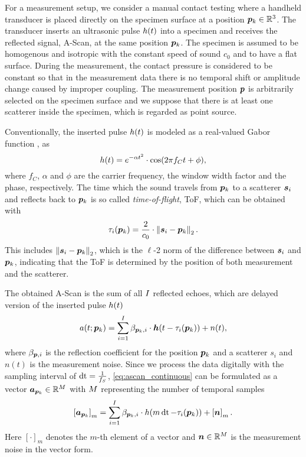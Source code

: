 For a measurement setup, we consider a manual contact testing where a handheld transducer is placed directly on the specimen surface at a position $\bm{p}_{k} \in {\mathbb{R}}^{3}$.
The transducer inserts an ultrasonic pulse $h (t)$ into a specimen and receives the reflected signal, A-Scan, at the same position $\bm{p}_{k}$. The specimen is assumed to be homogenous and isotropic with the constant speed of sound $c_0$ and to have a flat surface. During the measurement, the contact pressure is considered to be constant so that in the measurement data there is no temporal shift or amplitude change caused by improper coupling. The measurement position $\bm{p}$ is arbitrarily selected on the specimen surface and we suppose that there is at least one scatterer inside the specimen, which is regarded as point source. \par

Conventionally, the inserted pulse $h (t)$ is modeled as a real-valued Gabor function \citep{GaborAsymmChirp}, as
\begin{equation} \label{eq:pulse}
	\pulsesig (t) = e^{- \alpha t^2} \cdot \cos (2 \pi f_C t + \phi),
\end{equation}
where $f_C$, $\alpha$  and $\phi$ are the carrier frequency, the window width factor and the phase, respectively.
The time which the sound travels from $\bm{p}_{k}$ to a scatterer $\bm{s}_{i}$ and reflects back to $\bm{p}_{k}$ is so called \textit{time-of-flight}, ToF, which can be obtained with
\begin{equation} \label{eq:tof}
	\tau_{i}(\pp_{k}) = \frac{2}{c_0} \cdot \norm{\scatterer_{i} - \pp_{k} }_{2}.
\end{equation}
This includes $\left\lVert\bm{s}_{i} - \bm{p}_{k}\right\rVert_{2}$, which is the $\ell$-2 norm of the difference between $\bm{s}_{i}$ and $\bm{p}_{k}$, indicating that the ToF is determined by the position of both measurement and the scatterer. \par

The obtained A-Scan is the sum of all $I$ reflected echoes, which are delayed version of the inserted pulse $h (t)$
\begin{equation} \label{eq:ascan_continuous}
	\ascansig (t; \pp_{k}) = \sum_{i = 1}^{I} \refcoeff_{\pp_{k}, i} \cdot \pulse (t - \tau_{i} (\pp_{k}) ) + n(t),
\end{equation}
where $\beta_{\bm{p}, i}$ is the reflection coefficient for the position $\bm{p}_{k}$ and a scatterer $s_i$ and $n (t)$ is the measurement noise. Since we process the data digitally with the sampling interval of $\operatorname{dt} = \frac{1}{f_S}$, \eqref{eq:ascan_continuous} can be formulated as a vector $ \bm{a}_{\bm{p}_{k}} \in {\mathbb{R}}^{M}$ with $M$ representing the number of temporal samples 
\begin{equation} \label{eq:ascan_discrete}
	\left[ \ascan{\pp_{k}} \right]_m = \sum_{i = 1}^{\I} \refcoeff_{\pp_{k}, i} \cdot \pulsesig (m \dt - \tau_{i} (\pp_{k}) ) + \left[ \noisevec \right]_m.
\end{equation}
Here $[ \cdot ]_m$ denotes the $m$-th element of a vector and $\bm{n} \in {\mathbb{R}}^{M}$ is the measurement noise in the vector form. \par

